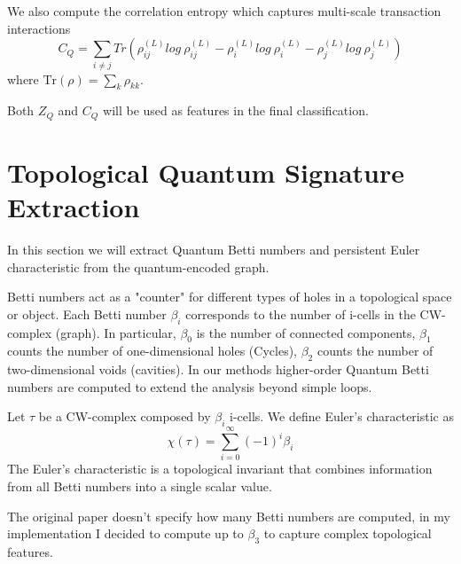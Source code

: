 We also compute the correlation entropy which captures multi-scale transaction interactions
\begin{equation}
    C_{Q}=\sum_{i\ne j}Tr(\rho_{ij}^{(L)}log~\rho_{ij}^{(L)}-\rho_{i}^{(L)}log~\rho_{i}^{(L)}-\rho_{j}^{(L)}log~\rho_{j}^{(L)})
\end{equation}
where $\text{Tr}(\rho) = \sum_k \rho_{kk}$.

Both \(Z_{Q}\) and \(C_{Q}\) will be used as features in the final classification.

\section{Topological Quantum Signature Extraction}
In this section we will extract Quantum Betti numbers and persistent Euler characteristic from the quantum-encoded graph.
\begin{definition}
    Betti numbers act as a "counter" for different types of holes in a topological space or object. Each Betti number \(\beta_i\) corresponds to the number of i-cells in the CW-complex (graph). In particular, \(\beta_0\) is the number of connected components, \(\beta_1\) counts the number of one-dimensional holes (Cycles), \(\beta_2\) counts the number of two-dimensional voids (cavities). In our methods higher-order Quantum Betti numbers are computed to extend the analysis beyond simple loops.
\end{definition}
\begin{definition}
    Let \(\tau\) be a CW-complex composed by \(\beta_i\) i-cells. We define Euler's characteristic as
    \begin{equation}
        \chi(\tau) = \sum_{i=0}^{\infty} (-1)^i \beta_i
    \end{equation}
    The Euler's characteristic is a topological invariant that combines information from all Betti numbers into a single scalar value.
\end{definition}
The original paper doesn't specify how many Betti numbers are computed, in my implementation I decided to compute up to \(\beta_3\) to capture complex topological features.

